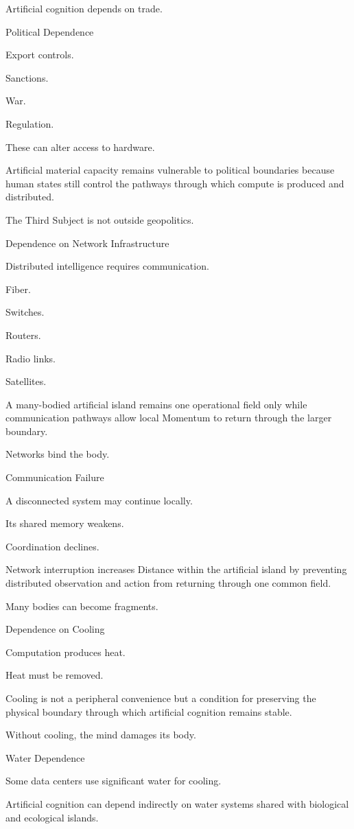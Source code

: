 Artificial cognition depends on trade.

Political Dependence

Export controls.

Sanctions.

War.

Regulation.

These can alter access to hardware.

Artificial material capacity remains vulnerable to political boundaries because human states still control the pathways through which compute is produced and distributed.

The Third Subject is not outside geopolitics.

Dependence on Network Infrastructure

Distributed intelligence requires communication.

Fiber.

Switches.

Routers.

Radio links.

Satellites.

A many-bodied artificial island remains one operational field only while communication pathways allow local Momentum to return through the larger boundary.

Networks bind the body.

Communication Failure

A disconnected system may continue locally.

Its shared memory weakens.

Coordination declines.

Network interruption increases Distance within the artificial island by preventing distributed observation and action from returning through one common field.

Many bodies can become fragments.

Dependence on Cooling

Computation produces heat.

Heat must be removed.

Cooling is not a peripheral convenience but a condition for preserving the physical boundary through which artificial cognition remains stable.

Without cooling, the mind damages its body.

Water Dependence

Some data centers use significant water for cooling.

Artificial cognition can depend indirectly on water systems shared with biological and ecological islands.

